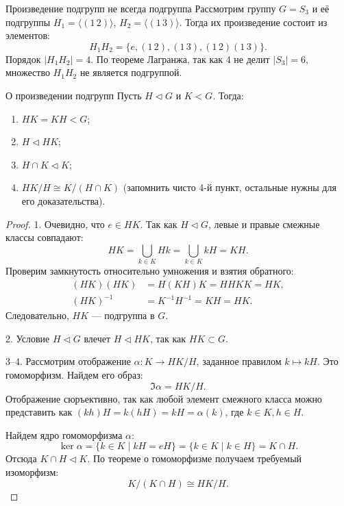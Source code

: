 \begin{Example}{Произведение подгрупп не всегда подгруппа}{}
	Рассмотрим группу $G = S_3$ и её подгруппы $H_1 = \langle(1\,2)\rangle$, $H_2 = \langle(1\,3)\rangle$.
	Тогда их произведение состоит из элементов:
	\[
	H_1H_2 = \{ e, (1\,2), (1\,3), (1\,2)(1\,3) \}.
	\]
	Порядок $|H_1H_2| = 4$. По теореме Лагранжа, так как 4 не делит $|S_3| = 6$, множество $H_1H_2$ не является подгруппой.
\end{Example}

\begin{Theorem}{О произведении подгрупп}{}
	Пусть $H \triangleleft G$ и $K < G$. Тогда:
	\begin{enumerate}
		\item $HK = KH < G$;
		\item $H \triangleleft HK$;
		\item $H \cap K \triangleleft K$;
		\item $HK/H \cong K/(H \cap K)$ (запомнить чисто 4-й пункт, остальные нужны для его доказательства).
	\end{enumerate}
\end{Theorem}

\begin{proof}
	1. Очевидно, что $e \in HK$. Так как $H \triangleleft G$, левые и правые смежные классы совпадают:
	\[
	HK = \bigcup_{k \in K} Hk = \bigcup_{k \in K} kH = KH.
	\]
	Проверим замкнутость относительно умножения и взятия обратного:
	\begin{align*}
		(HK)(HK) &= H(KH)K = HHKK = HK, \\
		(HK)^{-1} &= K^{-1}H^{-1} = KH = HK.
	\end{align*}
	Следовательно, $HK$ --- подгруппа в $G$.
	
	2. Условие $H \triangleleft G$ влечет $H \triangleleft HK$, так как $HK \subset G$.
	
	3--4. Рассмотрим отображение $\alpha \colon K \to HK/H$, заданное правилом $k \mapsto kH$. Это гомоморфизм.
	Найдем его образ:
	\[
	\Im \alpha = HK/H.
	\]
	Отображение сюръективно, так как любой элемент смежного класса можно представить как $(kh)H = k(hH) = kH = \alpha(k)$, где $k \in K, h \in H$.
	
	Найдем ядро гомоморфизма $\alpha$:
	\[
	\ker \alpha = \{ k \in K \mid kH = eH \} = \{ k \in K \mid k \in H \} = K \cap H.
	\]
	Отсюда $K \cap H \triangleleft K$. По теореме о гомоморфизме получаем требуемый изоморфизм:
	\[
	K/(K \cap H) \cong HK/H.
	\]
\end{proof}

